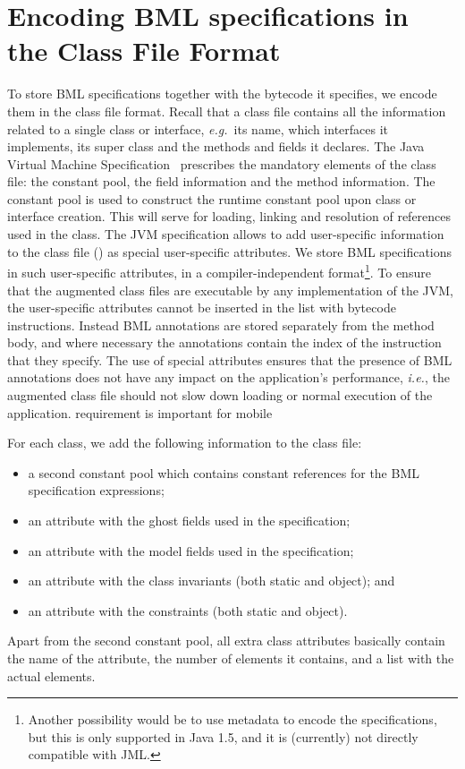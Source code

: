 \section{Encoding BML specifications in the Class File Format}
\label{SecClassfile}

To store BML specifications together with the bytecode it specifies,
we encode them in the class file format. Recall that a class file
contains all the information related to a single class or interface,
\emph{e.g.}\ its name, which interfaces it implements, its
super class and the methods and fields it declares. The Java Virtual
Machine Specification~\cite{JVMspec} prescribes the mandatory elements
of the class file: the constant pool, the field information and the
method information. The constant pool is used to construct the runtime
constant pool upon class or interface creation. This will serve for
loading, linking and resolution of references used in the class. The
JVM specification allows to add user-specific information to the class
file (\cite[\S4.7.1]{JVMspec}) as special user-specific attributes.
We store BML specifications in such user-specific attributes, in a
compiler-independent format\footnote{Another possibility would be to
use metadata to encode the specifications, but this is only supported
in Java 1.5, and it is (currently) not directly compatible with
JML.}. To ensure that the augmented class files are executable by any
implementation of the JVM, the user-specific attributes cannot be
inserted in the list with bytecode instructions. Instead BML
annotations are stored separately from the method body, and where
necessary the annotations contain the index of the instruction that
they specify. The use of special attributes ensures that the presence
of BML annotations does not have any impact on the application's
performance, \emph{i.e.}, the augmented class file should not slow
down loading or normal execution of the application. %
requirement is important for mobile


For each class, we add the following information to the class file:
\begin{itemize}
\item a second constant pool which contains constant references
      for the BML specification expressions;
\item an attribute with the ghost fields used in the specification;
\item an attribute with the model fields used in the specification;
\item an attribute with the class invariants (both static and object); and
\item an attribute with the constraints (both static and object).
\end{itemize}
Apart from the second constant pool, all extra class attributes
basically contain the name of the attribute, the number of elements it
contains, and a list with the actual elements.


